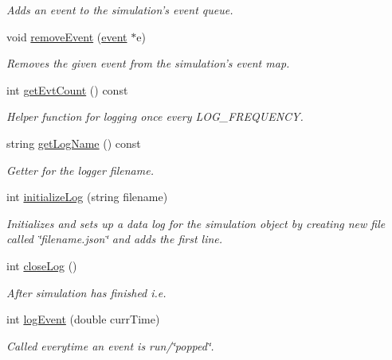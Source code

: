 \begin{DoxyCompactItemize}
\begin{DoxyCompactList}\small\item\em Adds an event to the simulation's event queue. \end{DoxyCompactList}\item 
void \hyperlink{classsimulation_ac892d078077d836e1485250fefa4d203}{remove\-Event} (\hyperlink{classevent}{event} $\ast$e)
\begin{DoxyCompactList}\small\item\em Removes the given event from the simulation's event map. \end{DoxyCompactList}\item 
int \hyperlink{classsimulation_a1f3e3d3f46dded9a502798fa365c9970}{get\-Evt\-Count} () const 
\begin{DoxyCompactList}\small\item\em Helper function for logging once every L\-O\-G\-\_\-\-F\-R\-E\-Q\-U\-E\-N\-C\-Y. \end{DoxyCompactList}\item 
string \hyperlink{classsimulation_a12f82c019cfc771eccd95757ede9d91c}{get\-Log\-Name} () const 
\begin{DoxyCompactList}\small\item\em Getter for the logger filename. \end{DoxyCompactList}\item 
int \hyperlink{classsimulation_a0f6146fb1f1be72aaeee46f05335b4d5}{initialize\-Log} (string filename)
\begin{DoxyCompactList}\small\item\em Initializes and sets up a data log for the simulation object by creating new file called \char`\"{}filename.\-json\char`\"{} and adds the first line. \end{DoxyCompactList}\item 
int \hyperlink{classsimulation_ac3aefae7b2523c907f630e33efb867c4}{close\-Log} ()
\begin{DoxyCompactList}\small\item\em After simulation has finished i.\-e. \end{DoxyCompactList}\item 
int \hyperlink{classsimulation_a13a372f20510ed79c4c09e1388d61b31}{log\-Event} (double curr\-Time)
\begin{DoxyCompactList}\small\item\em Called everytime an event is run/\char`\"{}popped\char`\"{}. \end{DoxyCompactList}\item 

\end{DoxyCompactItemize}
